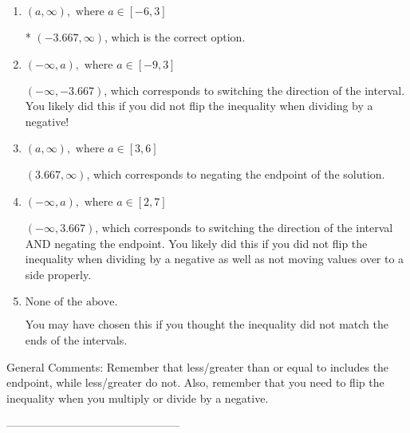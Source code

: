 \documentclass{article}[14pt]
\begin{document}
\begin{enumerate}[label=\Alph*.] 
\item $ (a, \infty), \text{ where } a \in [-6, 3] $ 

 * $(-3.667, \infty)$, which is the correct option. 
\item $ (-\infty, a), \text{ where } a \in [-9, 3] $ 

  $(-\infty, -3.667)$, which corresponds to switching the direction of the interval. You likely did this if you did not flip the inequality when dividing by a negative! 
\item $ (a, \infty), \text{ where } a \in [3, 6] $ 

  $(3.667, \infty)$, which corresponds to negating the endpoint of the solution. 
\item $ (-\infty, a), \text{ where } a \in [2, 7] $ 

  $(-\infty, 3.667)$, which corresponds to switching the direction of the interval AND negating the endpoint. You likely did this if you did not flip the inequality when dividing by a negative as well as not moving values over to a side properly. 
\item $ \text{None of the above}. $ 

 You may have chosen this if you thought the inequality did not match the ends of the intervals. 
\end{enumerate} 
 
General Comments: Remember that less/greater than or equal to includes the endpoint, while less/greater do not. Also, remember that you need to flip the inequality when you multiply or divide by a negative.

-----------------------------------------------
\end{document}
